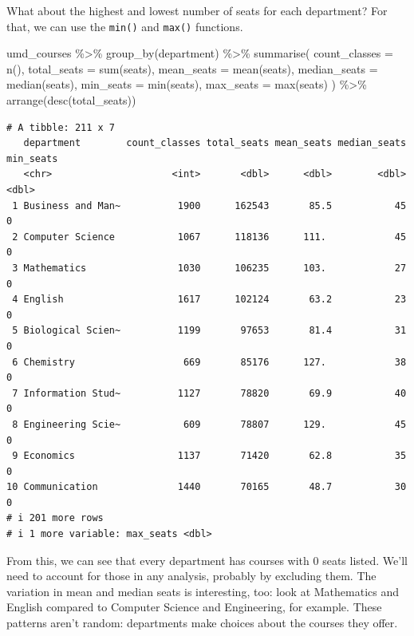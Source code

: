 \documentclass[
  letterpaper,
  DIV=11,
  numbers=noendperiod]{scrreprt}
\newenvironment{Shaded}{\begin{snugshade}}{\end{snugshade}}
\newcommand{\AttributeTok}[1]{\textcolor[rgb]{0.40,0.45,0.13}{#1}}
\newcommand{\FunctionTok}[1]{\textcolor[rgb]{0.28,0.35,0.67}{#1}}
\newcommand{\NormalTok}[1]{\textcolor[rgb]{0.00,0.23,0.31}{#1}}
\newcommand{\SpecialCharTok}[1]{\textcolor[rgb]{0.37,0.37,0.37}{#1}}
\begin{document}
What about the highest and lowest number of seats for each department?
For that, we can use the \texttt{min()} and \texttt{max()} functions.

\begin{Shaded}
\begin{Highlighting}[]
\NormalTok{umd\_courses }\SpecialCharTok{\%\textgreater{}\%}
  \FunctionTok{group\_by}\NormalTok{(department) }\SpecialCharTok{\%\textgreater{}\%}
  \FunctionTok{summarise}\NormalTok{(}
    \AttributeTok{count\_classes =} \FunctionTok{n}\NormalTok{(),}
    \AttributeTok{total\_seats =} \FunctionTok{sum}\NormalTok{(seats),}
    \AttributeTok{mean\_seats =} \FunctionTok{mean}\NormalTok{(seats),}
    \AttributeTok{median\_seats =} \FunctionTok{median}\NormalTok{(seats),}
    \AttributeTok{min\_seats =} \FunctionTok{min}\NormalTok{(seats),}
    \AttributeTok{max\_seats =} \FunctionTok{max}\NormalTok{(seats)}
\NormalTok{  ) }\SpecialCharTok{\%\textgreater{}\%}
  \FunctionTok{arrange}\NormalTok{(}\FunctionTok{desc}\NormalTok{(total\_seats))}
\end{Highlighting}
\end{Shaded}

\begin{verbatim}
# A tibble: 211 x 7
   department        count_classes total_seats mean_seats median_seats min_seats
   <chr>                     <int>       <dbl>      <dbl>        <dbl>     <dbl>
 1 Business and Man~          1900      162543       85.5           45         0
 2 Computer Science           1067      118136      111.            45         0
 3 Mathematics                1030      106235      103.            27         0
 4 English                    1617      102124       63.2           23         0
 5 Biological Scien~          1199       97653       81.4           31         0
 6 Chemistry                   669       85176      127.            38         0
 7 Information Stud~          1127       78820       69.9           40         0
 8 Engineering Scie~           609       78807      129.            45         0
 9 Economics                  1137       71420       62.8           35         0
10 Communication              1440       70165       48.7           30         0
# i 201 more rows
# i 1 more variable: max_seats <dbl>
\end{verbatim}

From this, we can see that every department has courses with 0 seats
listed. We'll need to account for those in any analysis, probably by
excluding them. The variation in mean and median seats is interesting,
too: look at Mathematics and English compared to Computer Science and
Engineering, for example. These patterns aren't random: departments make
choices about the courses they offer.
\end{document}

